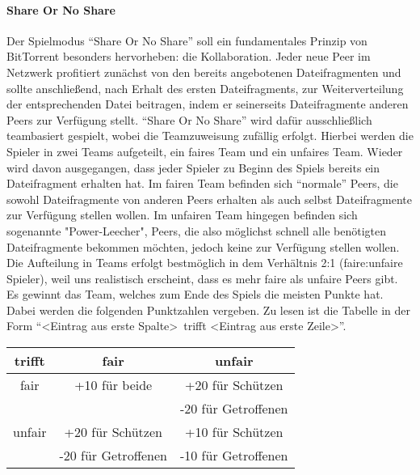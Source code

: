 \paragraph{Share Or No Share}
Der Spielmodus “Share Or No Share” soll ein fundamentales Prinzip von BitTorrent besonders hervorheben: die Kollaboration. Jeder neue Peer im Netzwerk profitiert zunächst von den bereits angebotenen Dateifragmenten und sollte anschließend, nach Erhalt des ersten Dateifragments, zur Weiterverteilung der entsprechenden Datei beitragen, indem er seinerseits Dateifragmente anderen Peers zur Verfügung stellt.
“Share Or No Share” wird dafür ausschließlich teambasiert gespielt, wobei die Teamzuweisung zufällig erfolgt. Hierbei werden die Spieler in zwei Teams aufgeteilt, ein faires Team und ein unfaires Team. Wieder wird davon ausgegangen, dass jeder Spieler zu Beginn des Spiels bereits ein Dateifragment erhalten hat. Im fairen Team befinden sich “normale” Peers, die sowohl Dateifragmente von anderen Peers erhalten als auch selbst Dateifragmente zur Verfügung stellen wollen. Im unfairen Team hingegen befinden sich sogenannte "Power-Leecher", Peers, die also möglichst schnell alle benötigten Dateifragmente bekommen möchten, jedoch keine zur Verfügung stellen wollen. Die Aufteilung in Teams erfolgt bestmöglich in dem Verhältnis 2:1 (faire:unfaire Spieler), weil uns realistisch erscheint, dass es mehr faire als unfaire Peers gibt.
Es gewinnt das Team, welches zum Ende des Spiels die meisten Punkte hat. Dabei werden die folgenden Punktzahlen vergeben. Zu lesen ist die Tabelle in der Form “\textless Eintrag aus erste Spalte\textgreater\ trifft \textless Eintrag aus erste Zeile\textgreater”. \newline

\begin{tabular}{|c|c|c|}\hline
    trifft & fair & unfair \\ \hline
    fair & +10 für beide & +20 für Schützen \\
     & & -20 für Getroffenen \\ \hline
    unfair & +20 für Schützen & +10 für Schützen \\
     & -20 für Getroffenen & -10 für Getroffenen \\ \hline
\end{tabular}
\newline

